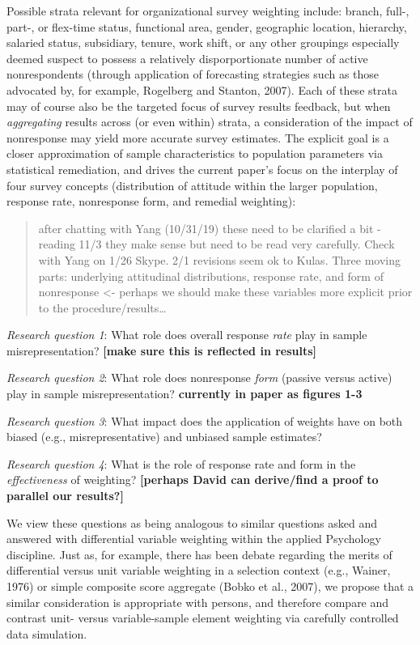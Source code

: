 \documentclass[
  man,floatsintext]{apa7}
\begin{document}
Possible strata relevant for organizational survey weighting include: branch, full-, part-, or flex-time status, functional area, gender, geographic location, hierarchy, salaried status, subsidiary, tenure, work shift, or any other groupings especially deemed suspect to possess a relatively disporportionate number of active nonrespondents (through application of forecasting strategies such as those advocated by, for example, Rogelberg and Stanton, 2007). Each of these strata may of course also be the targeted focus of survey results feedback, but when \emph{aggregating} results across (or even within) strata, a consideration of the impact of nonresponse may yield more accurate survey estimates. The explicit goal is a closer approximation of sample characteristics to population parameters via statistical remediation, and drives the current paper's focus on the interplay of four survey concepts (distribution of attitude within the larger population, response rate, nonresponse form, and remedial weighting):

\begin{quote}
after chatting with Yang (10/31/19) these need to be clarified a bit - reading 11/3 they make sense but need to be read very carefully. Check with Yang on 1/26 Skype. 2/1 revisions seem ok to Kulas. Three moving parts: underlying attitudinal distributions, response rate, and form of nonresponse \textless- perhaps we should make these variables more explicit prior to the procedure/results\ldots{}
\end{quote}

\emph{Research question 1}: What role does overall response \emph{rate} play in sample misrepresentation? \textbf{{[}make sure this is reflected in results{]}}

\emph{Research question 2}: What role does nonresponse \emph{form} (passive versus active) play in sample misrepresentation? \textbf{currently in paper as figures 1-3}

\emph{Research question 3}: What impact does the application of weights have on both biased (e.g., misrepresentative) and unbiased sample estimates?

\emph{Research question 4}: What is the role of response rate and form in the \emph{effectiveness} of weighting? \textbf{{[}perhaps David can derive/find a proof to parallel our results?{]}}

We view these questions as being analogous to similar questions asked and answered with differential variable weighting within the applied Psychology discipline. Just as, for example, there has been debate regarding the merits of differential versus unit variable weighting in a selection context (e.g., Wainer, 1976) or simple composite score aggregate (Bobko et al., 2007), we propose that a similar consideration is appropriate with persons, and therefore compare and contrast unit- versus variable-sample element weighting via carefully controlled data simulation.
\end{document}
